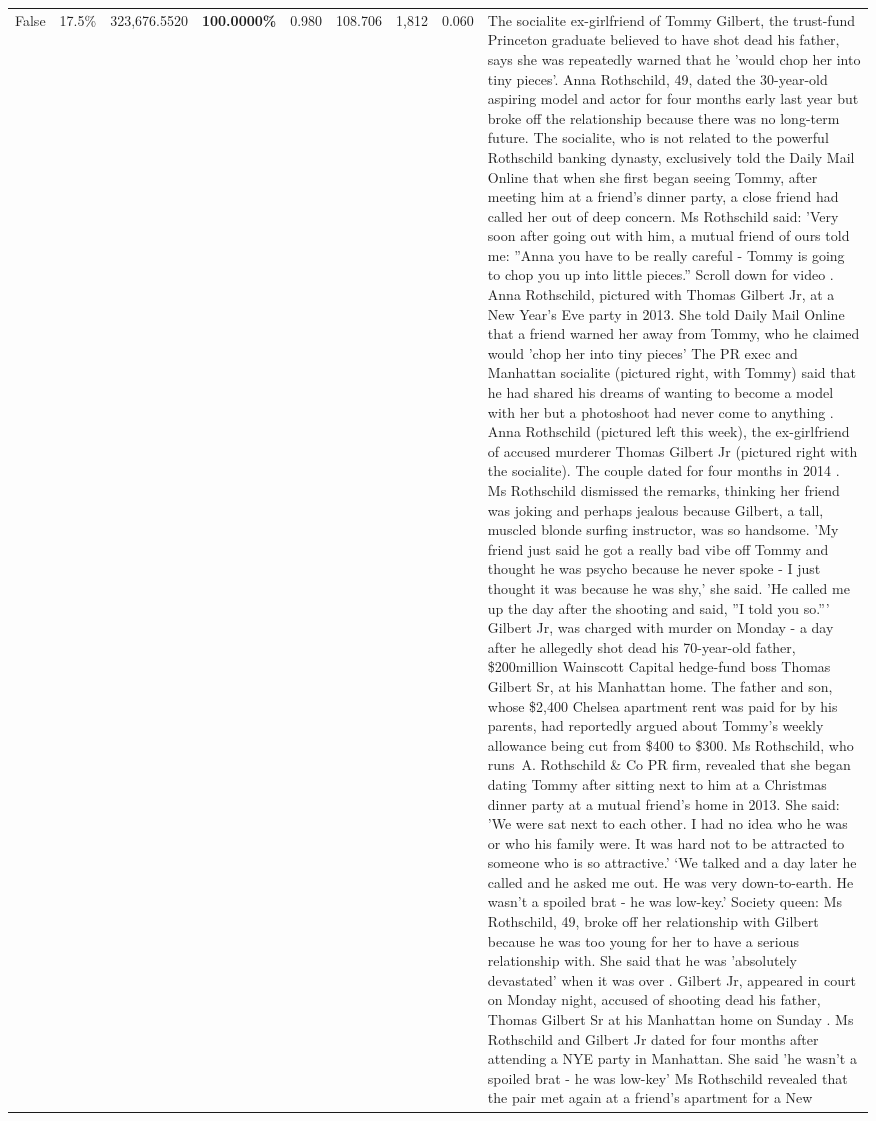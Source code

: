 \begin{table}[H]
\begin{tabular}{lllrlllll}
False & 17.5\% & 323,676.5520 & \bfseries \color{red} 100.0000\% & 0.980 & 108.706 & 1,812 & 0.060 & The socialite ex-girlfriend of Tommy Gilbert, the trust-fund Princeton graduate believed to have shot dead his father, says she was repeatedly warned that he 'would chop her into tiny pieces'. Anna Rothschild, 49, dated the 30-year-old aspiring model and actor for four months early last year but broke off the relationship because there was no long-term future. The socialite, who is not related to the powerful Rothschild banking dynasty, exclusively told the Daily Mail Online that when she first began seeing Tommy, after meeting him at a friend's dinner party, a close friend had called her out of deep concern. Ms Rothschild said: 'Very soon after going out with him, a mutual friend of ours told me: ''Anna you have to be really careful - Tommy is going to chop you up into little pieces.'' Scroll down for video . Anna Rothschild, pictured with Thomas Gilbert Jr, at a New Year's Eve party in 2013. She told Daily Mail Online that a friend warned her away from Tommy, who he claimed would 'chop her into tiny pieces' The PR exec and Manhattan socialite (pictured right, with Tommy) said that he had shared his dreams of wanting to become a model with her but a photoshoot had never come to anything . Anna Rothschild (pictured left this week), the ex-girlfriend of accused murderer Thomas Gilbert Jr (pictured right with the socialite). The couple dated for four months in 2014 . Ms Rothschild dismissed the remarks, thinking her friend was joking and perhaps jealous because Gilbert, a tall, muscled blonde surfing instructor, was so handsome. 'My friend just said he got a really bad vibe off Tommy and thought he was psycho because he never spoke - I just thought it was because he was shy,' she said. 'He called me up the day after the shooting and said, ''I told you so.''' Gilbert Jr, was charged with murder on Monday - a day after he allegedly shot dead his 70-year-old father, \$200million Wainscott Capital hedge-fund boss Thomas Gilbert Sr, at his Manhattan home. The father and son, whose \$2,400 Chelsea apartment rent was paid for by his parents, had reportedly argued about Tommy's weekly allowance being cut from \$400 to \$300. Ms Rothschild, who runs A. Rothschild \& Co PR firm, revealed that she began dating Tommy after sitting next to him at a Christmas dinner party at a mutual friend's home in 2013. She said: 'We were sat next to each other. I had no idea who he was or who his family were. It was hard not to be attracted to someone who is so attractive.' ‘We talked and a day later he called and he asked me out. He was very down-to-earth. He wasn’t a spoiled brat - he was low-key.’ Society queen: Ms Rothschild, 49, broke off her relationship with Gilbert because he was too young for her to have a serious relationship with. She said that he was 'absolutely devastated' when it was over . Gilbert Jr, appeared in court on Monday night, accused of shooting dead his father, Thomas Gilbert Sr at his Manhattan home on Sunday . Ms Rothschild and Gilbert Jr dated for four months after attending a NYE party in Manhattan. She said 'he wasn't a spoiled brat - he was low-key' Ms Rothschild revealed that the pair met again at a friend’s apartment for a New 
\end{tabular}
\end{table}
